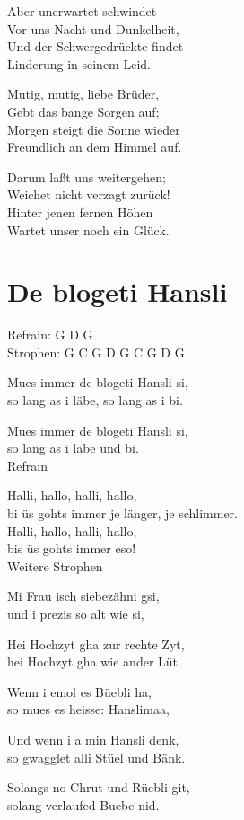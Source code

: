 \documentclass[
  letterpaper,
]{scrbook}
\begin{document}
Aber unerwartet schwindet\\
Vor uns Nacht und Dunkelheit,\\
Und der Schwergedrückte findet\\
Linderung in seinem Leid.

Mutig, mutig, liebe Brüder,\\
Gebt das bange Sorgen auf;\\
Morgen steigt die Sonne wieder\\
Freundlich an dem Himmel auf.

Darum laßt uns weitergehen;\\
Weichet nicht verzagt zurück!\\
Hinter jenen fernen Höhen\\
Wartet unser noch ein Glück.

\hypertarget{de-blogeti-hansli}{%
\chapter{De blogeti Hansli}\label{de-blogeti-hansli}}

Refrain: G D G\\
Strophen: G C G D G C G D G

Mues immer de blogeti Hansli si,\\
so lang as i läbe, so lang as i bi.

Mues immer de blogeti Hansli si,\\
so lang as i läbe und bi.\\
Refrain

Halli, hallo, halli, hallo,\\
bi üs gohts immer je länger, je schlimmer.\\
Halli, hallo, halli, hallo,\\
bis üs gohts immer eso!\\
Weitere Strophen

Mi Frau isch siebezähni gsi,\\
und i prezis so alt wie si,

Hei Hochzyt gha zur rechte Zyt,\\
hei Hochzyt gha wie ander Lüt.

Wenn i emol es Büebli ha,\\
so mues es heisse: Hanslimaa,

Und wenn i a min Hansli denk,\\
so gwagglet alli Stüel und Bänk.

Solangs no Chrut und Rüebli git,\\
solang verlaufed Buebe nid.
\end{document}
